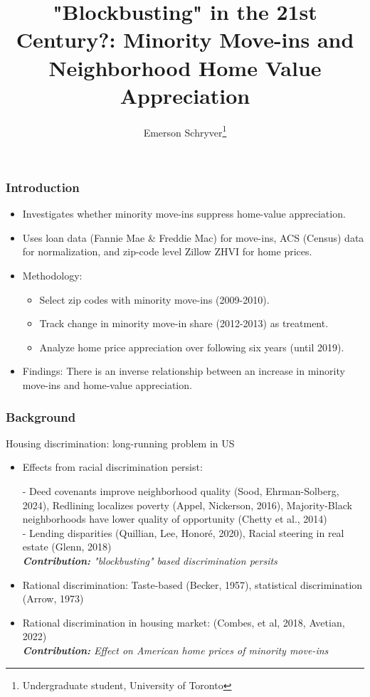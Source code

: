 \documentclass[aspectratio=169]{beamer}
\title[Minority Move-Ins and Home Appreciation]{"Blockbusting" in the 21st Century?: Minority Move-ins and Neighborhood Home Value Appreciation}
\author{Emerson Schryver\thanks{Undergraduate student, University of Toronto}}
\begin{document}
\begin{frame}
    \maketitle
\end{frame}
\begin{frame}
\frametitle{Introduction}
\begin{itemize}
    \item Investigates whether minority move-ins suppress home-value appreciation.
    \item Uses loan data (Fannie Mae \& Freddie Mac) for move-ins, ACS (Census) data for normalization, and zip-code level Zillow ZHVI for home prices.
    \item Methodology:
    \begin{itemize}
        \item Select zip codes with minority move-ins (2009-2010).
        \item Track change in minority move-in share (2012-2013) as treatment.
        \item Analyze home price appreciation over following six years (until 2019).
    \end{itemize}
    \item Findings: There is an inverse relationship between an increase in minority move-ins and home-value appreciation.
\end{itemize}
\end{frame}
\begin{frame}
    \frametitle{Background}
    Housing discrimination: long-running problem in US
    \begin{itemize}
        \item Effects from racial discrimination persist:
        
        \small
        - Deed covenants improve neighborhood quality (Sood, Ehrman-Solberg, 2024), Redlining localizes poverty (Appel, Nickerson, 2016), Majority-Black neighborhoods have lower quality of opportunity (Chetty et al., 2014)\\
        - Lending disparities (Quillian, Lee, Honoré, 2020), Racial steering in real estate (Glenn, 2018)\\
        \textit{\textbf{Contribution:} "blockbusting" based discrimination persits}
            
        \normalsize
        \item Rational discrimination: Taste-based (Becker, 1957), statistical discrimination (Arrow, 1973)
        \item Rational discrimination in housing market: (Combes, et al, 2018, Avetian, 2022)\\
        \small\textit{\textbf{Contribution:} Effect on American home prices of minority move-ins}
    \end{itemize}
\end{frame}
\end{document}
